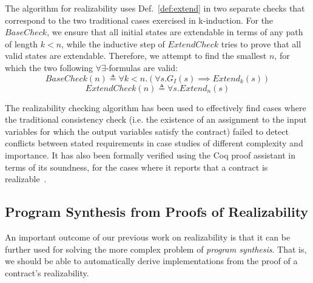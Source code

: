 The algorithm for realizability uses Def.~\ref{def:extend} in two
separate checks that correspond to the two traditional cases exercised
in k-induction. For the $\mathit{BaseCheck}$, we ensure that all
initial states are extendable in terms of any path of length $k < n$,
while the inductive step of $\mathit{ExtendCheck}$ tries to prove that
all valid states are extendable. Therefore, we attempt to find the
smallest $n$, for which the two following $\forall\exists$-formulas
are valid:%
%
\begin{equation}
\label{eq:sbcheck}
\mathit{BaseCheck}(n) \triangleq \forall k < n. (\forall s. G_I(s)
	  	\implies \mathit{Extend}_k(s))
\end{equation}%
%
\begin{equation}
\label{eq:echeck}
\mathit{ExtendCheck}(n) \triangleq \forall s. \mathit{Extend}_n(s)
\end{equation}

The realizability checking algorithm has been used to effectively find cases
where the traditional consistency check (i.e. the existence of an assignment
to the input variables for which the output variables satisfy the contract)
failed to detect conflicts between stated requirements in case studies of
different complexity and importance. It has also been formally verified using the Coq proof assistant in terms of its
soundness, for the cases where it reports that a contract is
realizable~\cite{katis2015machine}.

\subsection{Program Synthesis from Proofs of Realizability}

An important outcome of our previous work on realizability is that it
can be further used for solving the more complex problem of
\emph{program synthesis}. That is, we should be able to automatically
derive implementations from the proof of a contract's realizability.

